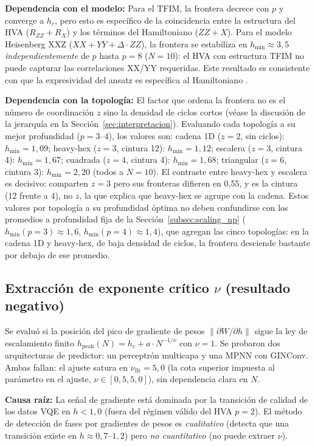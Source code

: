 \documentclass[11pt,a4paper,spanish]{book}
\begin{document}
\textbf{Dependencia con el modelo:} Para el TFIM, la frontera decrece con $p$ y converge a $h_c$, pero esto es específico de la coincidencia entre la estructura del HVA ($R_{ZZ} + R_X$) y los términos del Hamiltoniano ($ZZ + X$). Para el modelo Heisenberg XXZ ($XX + YY + \Delta \cdot ZZ$), la frontera se estabiliza en $h_{\min} \approx 3,5$ \emph{independientemente} de $p$ hasta $p = 8$ ($N = 10$): el HVA con estructura TFIM no puede capturar las correlaciones XX/YY requeridas. Este resultado es consistente con que la expresividad del ansatz es específica al Hamiltoniano \citep{wiersema2020}.

\textbf{Dependencia con la topología:} El factor que ordena la frontera no es el número de coordinación $z$ sino la densidad de ciclos cortos (véase la discusión de la jerarquía en la Sección~\ref{sec:interpretacion}). Evaluando cada topología a su mejor profundidad ($p = 3$--$4$), los valores son: cadena 1D ($z = 2$, sin ciclos): $h_{\min} = 1,09$; heavy-hex ($z = 3$, cintura 12): $h_{\min} = 1,12$; escalera ($z = 3$, cintura 4): $h_{\min} = 1,67$; cuadrada ($z = 4$, cintura 4): $h_{\min} = 1,68$; triangular ($z = 6$, cintura 3): $h_{\min} = 2,20$ (todos a $N = 10$). El contraste entre heavy-hex y escalera es decisivo: comparten $z = 3$ pero sus fronteras difieren en 0,55, y es la cintura (12 frente a 4), no $z$, la que explica que heavy-hex se agrupe con la cadena. Estos valores por topología a su profundidad óptima no deben confundirse con los promedios a profundidad fija de la Sección~\ref{subsec:scaling_np} ($h_{\min}(p{=}3) \approx 1,6$, $h_{\min}(p{=}4) \approx 1,4$), que agregan las cinco topologías: en la cadena 1D y heavy-hex, de baja densidad de ciclos, la frontera desciende bastante por debajo de ese promedio.

\subsection{Extracción de exponente crítico $\nu$ (resultado negativo)}

Se evaluó si la posición del pico de gradiente de pesos $\|\partial W / \partial h\|$ sigue la ley de escalamiento finito $h_{\text{peak}}(N) = h_c + a \cdot N^{-1/\nu}$ con $\nu = 1$. Se probaron dos arquitecturas de predictor: un perceptrón multicapa y una MPNN con GINConv. Ambas fallan: el ajuste satura en $\nu_{\text{fit}} = 5,0$ (la cota superior impuesta al parámetro en el ajuste, $\nu \in [0,5, 5,0]$), sin dependencia clara en $N$.

\textbf{Causa raíz:} La señal de gradiente está dominada por la transición de calidad de los datos VQE en $h < 1,0$ (fuera del régimen válido del HVA $p = 2$). El método de detección de fases por gradientes de pesos es \emph{cualitativo} (detecta que una transición existe en $h \approx 0,7$--$1,2$) pero \emph{no cuantitativo} (no puede extraer $\nu$).
\end{document}
